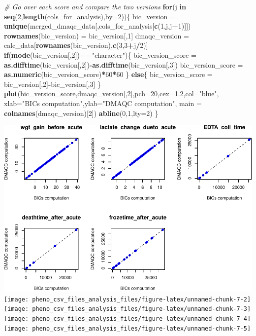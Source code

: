 \documentclass[]{article}
\newenvironment{Shaded}{\begin{snugshade}}{\end{snugshade}}
\newcommand{\KeywordTok}[1]{\textcolor[rgb]{0.13,0.29,0.53}{\textbf{#1}}}
\newcommand{\DataTypeTok}[1]{\textcolor[rgb]{0.13,0.29,0.53}{#1}}
\newcommand{\DecValTok}[1]{\textcolor[rgb]{0.00,0.00,0.81}{#1}}
\newcommand{\FloatTok}[1]{\textcolor[rgb]{0.00,0.00,0.81}{#1}}
\newcommand{\StringTok}[1]{\textcolor[rgb]{0.31,0.60,0.02}{#1}}
\newcommand{\CommentTok}[1]{\textcolor[rgb]{0.56,0.35,0.01}{\textit{#1}}}
\newcommand{\ControlFlowTok}[1]{\textcolor[rgb]{0.13,0.29,0.53}{\textbf{#1}}}
\newcommand{\OperatorTok}[1]{\textcolor[rgb]{0.81,0.36,0.00}{\textbf{#1}}}
\newcommand{\NormalTok}[1]{#1}
\begin{document}
\begin{Shaded}
\begin{Highlighting}[]
\CommentTok{# Go over each score and compare the two versions}
\ControlFlowTok{for}\NormalTok{(j }\ControlFlowTok{in} \KeywordTok{seq}\NormalTok{(}\DecValTok{2}\NormalTok{,}\KeywordTok{length}\NormalTok{(cols_for_analysis),}\DataTypeTok{by=}\DecValTok{2}\NormalTok{))\{}
\NormalTok{  bic_version =}\StringTok{ }\KeywordTok{unique}\NormalTok{(merged_dmaqc_data[,cols_for_analysis[}\KeywordTok{c}\NormalTok{(}\DecValTok{1}\NormalTok{,j,j}\OperatorTok{+}\DecValTok{1}\NormalTok{)]])}
  \KeywordTok{rownames}\NormalTok{(bic_version) =}\StringTok{ }\NormalTok{bic_version[,}\DecValTok{1}\NormalTok{]}
\NormalTok{  dmaqc_version =}\StringTok{ }\NormalTok{calc_data[}\KeywordTok{rownames}\NormalTok{(bic_version),}\KeywordTok{c}\NormalTok{(}\DecValTok{3}\NormalTok{,}\DecValTok{3}\OperatorTok{+}\NormalTok{j}\OperatorTok{/}\DecValTok{2}\NormalTok{)]}
  \ControlFlowTok{if}\NormalTok{(}\KeywordTok{mode}\NormalTok{(bic_version[,}\DecValTok{2}\NormalTok{])}\OperatorTok{==}\StringTok{"character"}\NormalTok{)\{}
\NormalTok{    bic_version_score =}\StringTok{ }\KeywordTok{as.difftime}\NormalTok{(bic_version[,}\DecValTok{2}\NormalTok{])}\OperatorTok{-}\KeywordTok{as.difftime}\NormalTok{(bic_version[,}\DecValTok{3}\NormalTok{])}
\NormalTok{    bic_version_score =}\StringTok{ }\KeywordTok{as.numeric}\NormalTok{(bic_version_score)}\OperatorTok{*}\DecValTok{60}\OperatorTok{*}\DecValTok{60}
\NormalTok{  \}}
  \ControlFlowTok{else}\NormalTok{\{}
\NormalTok{    bic_version_score =}\StringTok{ }\NormalTok{bic_version[,}\DecValTok{2}\NormalTok{]}\OperatorTok{-}\NormalTok{bic_version[,}\DecValTok{3}\NormalTok{]}
\NormalTok{  \}}
  \KeywordTok{plot}\NormalTok{(bic_version_score,dmaqc_version[,}\DecValTok{2}\NormalTok{],}\DataTypeTok{pch=}\DecValTok{20}\NormalTok{,}\DataTypeTok{cex=}\FloatTok{1.2}\NormalTok{,}\DataTypeTok{col=}\StringTok{"blue"}\NormalTok{,}
       \DataTypeTok{xlab=}\StringTok{"BICs computation"}\NormalTok{,}\DataTypeTok{ylab=}\StringTok{"DMAQC computation"}\NormalTok{,}
       \DataTypeTok{main =} \KeywordTok{colnames}\NormalTok{(dmaqc_version)[}\DecValTok{2}\NormalTok{])}
  \KeywordTok{abline}\NormalTok{(}\DecValTok{0}\NormalTok{,}\DecValTok{1}\NormalTok{,}\DataTypeTok{lty=}\DecValTok{2}\NormalTok{)}
\NormalTok{\}}
\end{Highlighting}
\end{Shaded}

\includegraphics[width=0.5\linewidth,height=0.5\textheight]{pheno_csv_files_analysis_files/figure-latex/unnamed-chunk-7-1}
\texttt{[image: pheno\_csv\_files\_analysis\_files/figure-latex/unnamed-chunk-7-2]}
\texttt{[image: pheno\_csv\_files\_analysis\_files/figure-latex/unnamed-chunk-7-3]}
\texttt{[image: pheno\_csv\_files\_analysis\_files/figure-latex/unnamed-chunk-7-4]}
\texttt{[image: pheno\_csv\_files\_analysis\_files/figure-latex/unnamed-chunk-7-5]}
\end{document}

